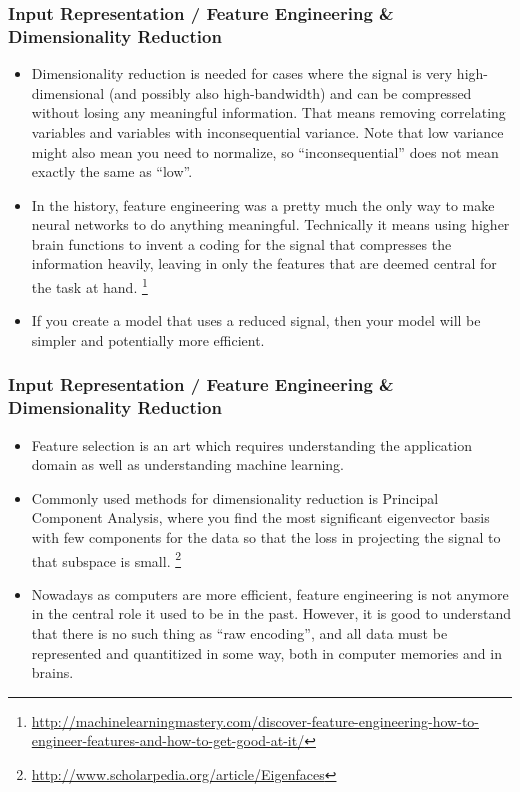 \documentclass[8pt]{beamer}
\begin{document}
\begin{frame}
\frametitle{Input Representation / Feature Engineering \& Dimensionality Reduction}
 \begin{itemize}
  \item Dimensionality reduction is needed for cases where the signal is very high-dimensional (and possibly also high-bandwidth) and can be compressed
        without losing any meaningful information. That means removing correlating variables and variables with inconsequential variance. Note that low variance might also
        mean you need to normalize, so ``inconsequential'' does not mean exactly the same as ``low''.
  \item In the history, feature engineering was a pretty much the only way to make neural networks to do anything meaningful. Technically it means using higher brain functions
        to invent a coding for the signal that compresses the information heavily, leaving in only the features that are deemed central for the task at hand.
  \footnote{\href{http://machinelearningmastery.com/discover-feature-engineering-how-to-\\engineer-features-and-how-to-get-good-at-it/}
                 {http://machinelearningmastery.com/discover-feature-engineering-how-to-engineer-features-and-how-to-get-good-at-it/}}
  \item If you create a model that uses a reduced signal, then your model will be simpler and potentially more efficient.
 \end{itemize} 
\end{frame}

\begin{frame}
\frametitle{Input Representation / Feature Engineering \& Dimensionality Reduction}
 \begin{itemize}
  \item Feature selection is an art which requires understanding the application domain as well as understanding machine learning.
  \item Commonly used methods for dimensionality reduction is Principal Component Analysis, where you find the most significant eigenvector basis with few components for the data
        so that the loss in projecting the signal to that subspace is small.
  \footnote{\href{http://www.scholarpedia.org/article/Eigenfaces}
                 {http://www.scholarpedia.org/article/Eigenfaces}}
  \item Nowadays as computers are more efficient, feature engineering is not anymore in the central role it used to be in the past. However, it is good to understand that there
        is no such thing as ``raw encoding'', and all data must be represented and quantitized in some way, both in computer memories and in brains.
 \end{itemize} 
\end{frame}
\end{document}
